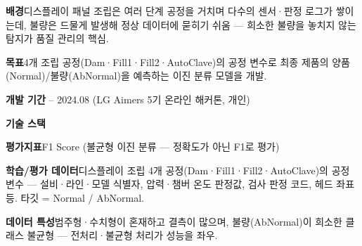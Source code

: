 

\begin{cvitems}
  \item {\textbf{배경}\enskip 디스플레이 패널 조립은 여러 단계 공정을 거치며 다수의 센서·판정 로그가 쌓이는데, 불량은 드물게 발생해 정상 데이터에 묻히기 쉬움 --- 희소한 불량을 놓치지 않는 탐지가 품질 관리의 핵심.}
  \item {\textbf{목표}\enskip 4개 조립 공정(Dam·Fill1·Fill2·AutoClave)의 공정 변수로 최종 제품의 양품(Normal)/불량(AbNormal)을 예측하는 이진 분류 모델을 개발.}
  \item {\textbf{개발 기간} -- 2024.08 (LG Aimers 5기 온라인 해커톤, 개인)}
  \item {\textbf{기술 스택}\enskip {}      }
  \item {\textbf{평가지표}\enskip F1 Score (불균형 이진 분류 --- 정확도가 아닌 F1로 평가)}
\end{cvitems}

\begin{cvitems}
  \item {\textbf{학습/평가 데이터}\enskip 디스플레이 조립 4개 공정(Dam·Fill1·Fill2·AutoClave)의 공정 변수 --- 설비·라인·모델 식별자, 압력·챔버 온도 판정값, 검사 판정 코드, 헤드 좌표 등. 타깃 = Normal / AbNormal.}
  \item {\textbf{데이터 특성}\enskip 범주형·수치형이 혼재하고 결측이 많으며, 불량(AbNormal)이 희소한 클래스 불균형 --- 전처리·불균형 처리가 성능을 좌우.}
\end{cvitems}


